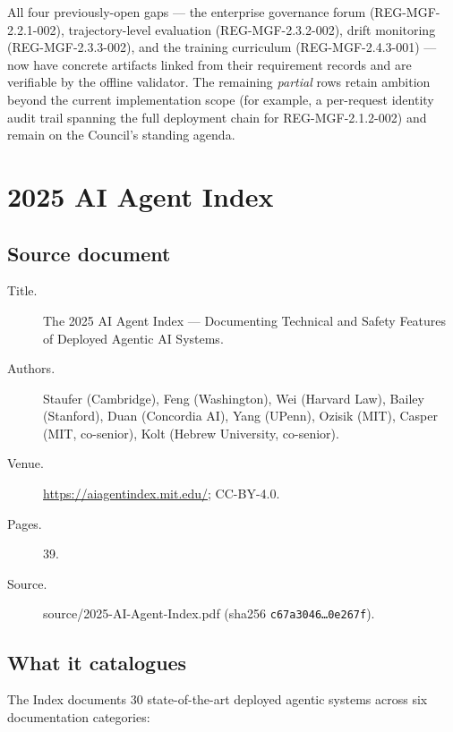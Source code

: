 \documentclass[11pt,a4paper,twoside]{report}
\newcommand{\corpus}{}
\begin{document}
All four previously-open gaps --- the enterprise governance forum
(REG-MGF-2.2.1-002), trajectory-level evaluation (REG-MGF-2.3.2-002),
drift monitoring (REG-MGF-2.3.3-002), and the training curriculum
(REG-MGF-2.4.3-001) --- now have concrete artifacts linked from their
requirement records and are verifiable by the offline validator. The
remaining \emph{partial} rows retain ambition beyond the current
implementation scope (for example, a per-request identity audit trail
spanning the full deployment chain for REG-MGF-2.1.2-002) and remain
on the Council's standing agenda.
\clearpage
\chapter{2025 AI Agent Index}
\label{ch:agent-index}

\section{Source document}

\begin{description}
\item[Title.] The 2025 AI Agent Index --- Documenting Technical and Safety
Features of Deployed Agentic AI Systems.
\item[Authors.] Staufer (Cambridge), Feng (Washington), Wei (Harvard
Law), Bailey (Stanford), Duan (Concordia AI), Yang (UPenn), Ozisik
(MIT), Casper (MIT, co-senior), Kolt (Hebrew University, co-senior).
\item[Venue.] \url{https://aiagentindex.mit.edu/}; CC-BY-4.0.
\item[Pages.] 39.
\item[Source.] \corpus{source/2025-AI-Agent-Index.pdf}
(sha256 \texttt{c67a3046\ldots0e267f}).
\end{description}

\section{What it catalogues}

The Index documents 30 state-of-the-art deployed agentic systems across
six documentation categories:
\end{document}
